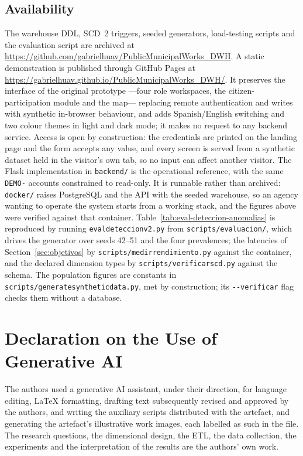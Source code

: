 \documentclass[runningheads]{llncs}
\renewcommand{\_}{\origunderscore\allowbreak}
\begin{document}
\subsection{Availability}
\label{sec:disponibilidad}
\begingroup
The warehouse DDL, SCD~2 triggers, seeded generators, load-testing scripts and the evaluation script are archived at {\small\url{https://github.com/gabrielhuav/PublicMunicipalWorks_DWH}}. A static demonstration is published through GitHub Pages at {\small\url{https://gabrielhuav.github.io/PublicMunicipalWorks_DWH/}}. It preserves the interface of the original prototype ---four role workspaces, the citizen-participation module and the map--- replacing remote authentication and writes with synthetic in-browser behaviour, and adds Spanish/English switching and two colour themes in light and dark mode; it makes no request to any backend service. Access is open by construction: the credentials are printed on the landing page and the form accepts any value, and every screen is served from a synthetic dataset held in the visitor's own tab, so no input can affect another visitor. The Flask implementation in \texttt{backend/} is the operational reference, with the same \texttt{DEMO-} accounts constrained to read-only. It is runnable rather than archived: \texttt{docker/} raises PostgreSQL and the API with the seeded warehouse, so an agency wanting to operate the system starts from a working stack, and the figures above were verified against that container. Table~\ref{tab:eval-deteccion-anomalias} is reproduced by running \texttt{eval\_deteccion\_v2.py} from \texttt{scripts/evaluacion/}, which drives the generator over seeds 42--51 and the four prevalences; the latencies of Section~\ref{sec:objetivos} by \texttt{scripts/medir\_rendimiento.py} against the container, and the declared dimension types by \texttt{scripts/verificar\_scd.py} against the schema. The population figures are constants in \texttt{scripts/generate\_synthetic\_data.py}, met by construction; its \texttt{-{}-verificar} flag checks them without a database.
\endgroup


\section*{Declaration on the Use of Generative AI}

The authors used a generative AI assistant, under their direction, for language
editing, \LaTeX{} formatting, drafting text subsequently revised and approved by
the authors, and writing the auxiliary scripts distributed with the artefact, and generating the artefact's illustrative work images, each labelled as such in the file. The
research questions, the dimensional design, the ETL, the data collection, the
experiments and the interpretation of the results are the authors' own work.
\end{document}
